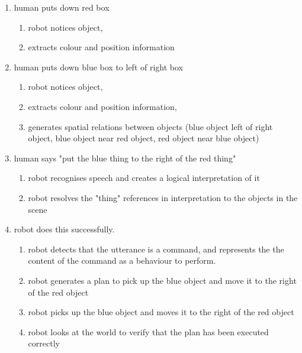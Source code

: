 \documentclass{article}
\begin{document}
\begin{enumerate}

\item \label{lvl2:redbox}
  human puts down red box
\begin{enumerate}
\item \label{lvl2:redbox:notice}
    robot notices object,
\item \label{lvl2:redbox:extract}
    extracts colour and position information
\end{enumerate}

\item \label{lvl2:bluebox}
  human puts down blue box to left of right box
\begin{enumerate}
\item \label{lvl2:bluebox:notice}
    robot notices object,
\item \label{lvl2:bluebox:extract}
    extracts colour and position information,
\item \label{lvl2:bluebox:spatial}
    generates spatial relations between objects (blue object left of
    right object, blue object near red object, red object near blue
    object)
\end{enumerate}

\item \label{lvl2:human}
  human says "put the blue thing to the right of the red thing"
\begin{enumerate}
\item \label{lvl2:human:speech}
    robot recognises speech and creates a logical interpretation of it
\item \label{lvl2:human:thing}
    robot resolves the "thing" references in interpretation to the
    objects in the scene
\end{enumerate}

\item \label{lvl2:success}
  robot does this successfully.
\begin{enumerate}
\item \label{lvl2:success:goalgen}
    robot detects that the utterance is a command, and represents the
    the content of the command as a behaviour to perform.
\item \label{lvl2:success:plangen}
    robot generates a plan to pick up the blue object and move it to
    the right of the red object
\item \label{lvl2:success:manip}
    robot picks up the blue object and moves it to the right of the
    red object
\item \label{lvl2:success:verify}
    robot looks at the world to verify that the plan has been executed
    correctly
\end{enumerate}

\end{enumerate}
\end{document}
